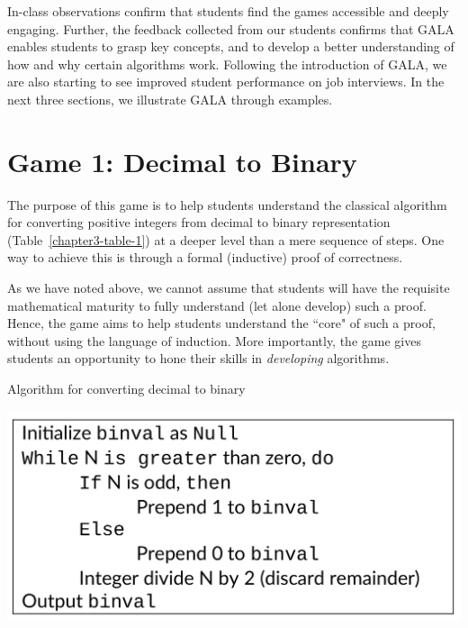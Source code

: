 \begin{multicols}{2}
In-class observations confirm that students find the games accessible and deeply engaging. Further, the feedback collected from our students confirms that GALA enables students to grasp key concepts, and to develop a better understanding of how and why certain algorithms work. Following the introduction of GALA, we are also starting to see improved student performance on job interviews. In the next three sections, we illustrate GALA through examples.

\vspace{-.3cm}

\section{Game 1: Decimal to Binary}\label{section-3}  

\vspace{-.2cm}

The purpose of this game is to help students understand the classical algorithm for converting positive integers from decimal to binary representation (Table~\ref{chapter3-table-1}) at a deeper level than a mere sequence of steps. One way to achieve this is through a formal (inductive) proof of correctness.
  
As we have noted above, we cannot assume that students will have the requisite mathematical maturity to fully understand (let alone develop) such a proof. Hence, the game aims to help students understand the ``core" of such a proof, without using the language of induction. More importantly, the game gives students an opportunity to hone their skills in \textit{developing} algorithms. 
\begin{table}[H]
\vspace{-.3cm}
\centering
\caption{Algorithm for converting decimal to binary}\label{chapter3-table-1}
\includegraphics[scale=.9]{src/Figures/chap3/table1.jpg}

\vspace{-.5cm}


\end{table}
\end{multicols}
